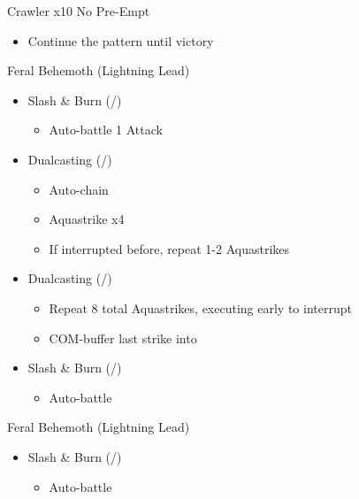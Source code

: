 \begin{paracol}{2}
\begin{battle}{Crawler x10 No Pre-Empt}
\begin{itemize}
			      \begin{itemize}
				      \item Continue the pattern until victory
			      \end{itemize}
		\end{itemize}
	\end{battle}
	\renewcommand{\first}{[1] Slash \& Burn (\com/\rav)}
	\renewcommand{\second}{[2] War \& Peace (\com/\med)}
	\renewcommand{\third}{[3] Supersoldier (\com/\syn)}
	\renewcommand{\fourth}{[4] Dualcasting (\rav/\rav)}
	\renewcommand{\fifth}{[5] Dualcasting (\rav/\rav)}
	\renewcommand{\sixth}{[6] Slash \& Burn (\com/\rav)}
	\switchcolumn*
	\begin{battle}{Feral Behemoth (Lightning Lead)}
		\begin{itemize}
			\item \first
			      \begin{itemize}
				      \item Auto-battle 1 Attack
			      \end{itemize}
			\item \fourth
			      \begin{itemize}
				      \item Auto-chain
				      \item Aquastrike x4
				      \item If interrupted before, repeat 1-2 Aquastrikes
			      \end{itemize}
			\item \fifth
			      \begin{itemize}
				      \item Repeat 8 total Aquastrikes, executing early to interrupt
				      \item COM-buffer last strike into
			      \end{itemize}
			\item \sixth
			      \begin{itemize}
				      \item Auto-battle
			      \end{itemize}
		\end{itemize}
	\end{battle}
	\switchcolumn
	\begin{battle}{Feral Behemoth (Lightning Lead)}
		\begin{itemize}
			\item \first
			      \begin{itemize}
				      \item Auto-battle

\end{itemize}
\end{itemize}
\end{battle}
\end{paracol}
